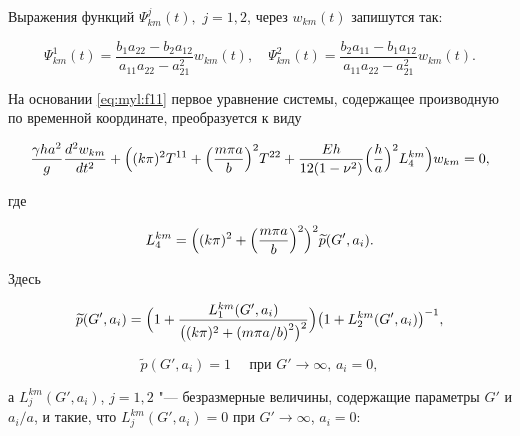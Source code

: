 Выражения функций $\Psi_{km}^j(t),$ $j=1, 2$, через $w_{km}(t)$ запишутся так:

\begin{equation}\label{eq:myl:f11}

\Psi_{km}^1(t)=\frac{b_1 a_{22}-b_2 a_{12}}{a_{11}a_{22}-a_{21}^2}w_{km}(t), \quad \Psi_{km}^2(t)=\frac{b_2 a_{11}-b_1a_{12}}{a_{11}a_{22}-a_{21}^2}w_{km}(t).

\end{equation}

На основании \eqref{eq:myl:f11} первое уравнение системы, содержащее производную по временной координате, преобразуется к виду

\begin{equation}\label{eq:myl:f12}

\frac{\gamma h a^2}{g}\frac{d^2w_{km}}{dt^2}+

\Bigl((k\pi)^2T^{11}+\Bigl(\frac{m\pi a}{b}\Bigr)^2T^{22}

+ \frac{E h}{12(1-\nu^2)}\Bigl(\frac{h}{a}\Bigr)^2 L_4^{km}\Bigr)w_{km}=0,

\end{equation}

где

\begin{equation}

\label{eq:myl:f13}

L_4^{km}=

\Bigl((k\pi)^2+\Bigl(\frac{m\pi a}{b}\Bigr)^2\Bigr)^2 \widetilde{p}(G',a_i).

\end{equation}

Здесь

\begin{equation}\label{eq:myl:f16}

\widetilde{p}(G',a_i) = \Bigl( {1+\frac{L_1^{km}(G',a_i)}{\bigl((k\pi)^2+\left({m\pi a}/{b}\right)^2\bigr)^2}} \Bigr) \bigl( {1+L_2^{km}(G',a_i)} \bigr)^{-1},

\end{equation}

\begin{equation*}

    \widetilde{p}(G',a_i)=1\quad \text{ при }  G' \rightarrow \infty, \, a_i=0,

\end{equation*}

а $L_j^{km}(G',a_i)$, $j=1,2$ "--- безразмерные величины, содержащие параметры $G'$ и ${a_i}/{a}$, и такие, что $L_j^{km}(G',a_i)=0$ при $G'\rightarrow \infty$, $a_i=0$:

